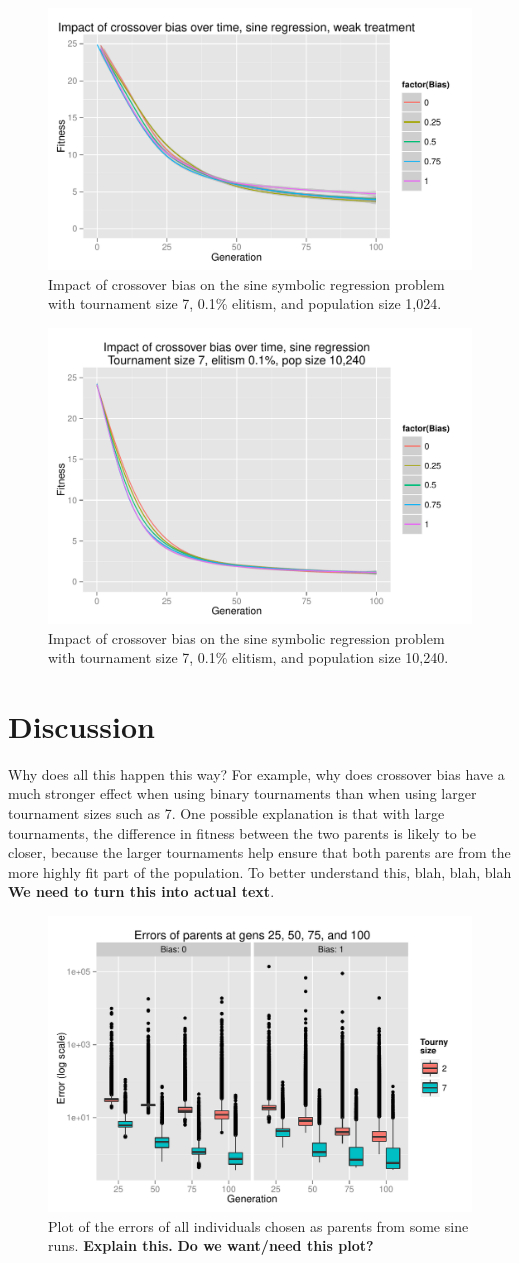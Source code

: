 \documentclass{sig-alternate}
\begin{document}
\begin{figure}
\centering
\includegraphics[width=0.45 \textwidth]{Plots/Sine_XO_fitness_vs_gen_weak.pdf}
\caption{Impact of crossover bias on the sine symbolic regression problem with tournament size 7, 0.1\% elitism, and 
population size 1,024.}
\label{fig:sineBiasFitnessVsGenWeak}
\end{figure}

\begin{figure}
\centering
\includegraphics[width=0.45 \textwidth]{Plots/Sine_XO_fitness_vs_gen_t2_e01_p10K.pdf}
\caption{Impact of crossover bias on the sine symbolic regression problem with tournament size 7, 0.1\% elitism, and 
population size 10,240.}
\label{fig:sineBiasFitnessVsGenT2E01P10K}
\end{figure}

\section{Discussion} \label{sec:Discussion}

Why does all this happen this way? For example, why does crossover bias have a much stronger effect when using binary
tournaments than when using larger tournament sizes such as 7. One possible explanation is that with large tournaments,
the difference in fitness between the two parents is likely to be closer, because the larger tournaments help ensure
that both parents are from the more highly fit part of the population. To better understand this, blah, blah, blah
\textbf{We need to turn this into actual text}.

\begin{figure}
\centering
\includegraphics[width=0.45 \textwidth]{Plots/Parent_errors_sine.pdf}
\caption{Plot of the errors of all individuals chosen as parents from some sine runs. \textbf{Explain this.} \textbf{Do
we want/need this plot?}}
\label{fig:parentErrorsSine}
\end{figure}
\end{document}
